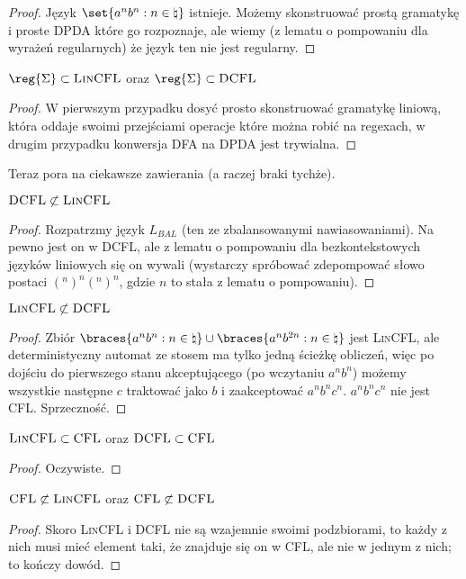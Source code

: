 \begin{proof}
    Język \( \set{a^nb^n : n\in \natural} \) istnieje. Możemy skonstruować prostą gramatykę i proste DPDA które go rozpoznaje, ale wiemy (z lematu o pompowaniu dla wyrażeń regularnych) że język ten nie jest regularny.
\end{proof}

\begin{theorem}
    \( \reg{\Sigma} \subset \textsc{LinCFL} \) oraz \( \reg{\Sigma} \subset \textsc{DCFL}\)
\end{theorem}

\begin{proof}
    W pierwszym przypadku dosyć prosto skonstruować gramatykę liniową, która oddaje swoimi przejściami operacje które można robić na regexach, w drugim przypadku konwersja DFA na DPDA jest trywialna.
\end{proof}

Teraz pora na ciekawsze zawierania (a raczej braki tychże). 

\begin{theorem}
    \( \textsc{DCFL} \not \subset \textsc{LinCFL} \)
\end{theorem}

\begin{proof}
    Rozpatrzmy język \(L_{BAL}\) (ten ze zbalansowanymi nawiasowaniami). Na pewno jest on w DCFL, ale z lematu o pompowaniu dla bezkontekstowych języków liniowych się on wywali (wystarczy spróbować zdepompować słowo postaci \( (^n)^n(^n)^n \), gdzie \(n\) to stała z lematu o pompowaniu).
\end{proof}

\begin{theorem}
     \( \textsc{LinCFL} \not \subset \textsc{DCFL} \)
\end{theorem}
\begin{proof}
    Zbiór \(\braces{a^nb^n: n \in \natural} \cup \braces{a^nb^{2n}:n\in\natural}\) jest \textsc{LinCFL},
    ale deterministyczny automat ze stosem ma tylko jedną ścieżkę obliczeń, więc po dojściu do pierwszego stanu akceptującego (po wczytaniu \(a^nb^n\)) możemy wszystkie następne \(c\) traktować jako \(b\) i zaakceptować \(a^nb^nc^n\). \(a^nb^nc^n\) nie jest \textsc{CFL}. Sprzeczność.
\end{proof}

\begin{theorem}
     \( \textsc{LinCFL} \subset \textsc{CFL}\) oraz \( \textsc{DCFL} \subset \textsc{CFL} \)
\end{theorem}
\begin{proof}
    Oczywiste.
\end{proof}

\begin{theorem}
     \( \textsc{CFL} \not\subset \textsc{LinCFL}\) oraz \( \textsc{CFL} \not \subset \textsc{DCFL} \)
\end{theorem}
\begin{proof}
    Skoro \textsc{LinCFL} i \textsc{DCFL} nie są wzajemnie swoimi podzbiorami, to każdy z nich musi mieć element taki, że znajduje się on w \textsc{CFL}, ale nie w jednym z nich; to kończy dowód. 
\end{proof}